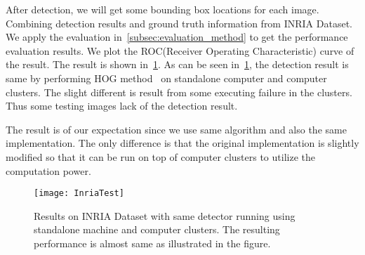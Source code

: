 After detection, we will get some bounding box locations for each image.
Combining detection results and ground truth information from INRIA Dataset.
We apply the evaluation in~\ref{subsec:evaluation_method} to get the
performance evaluation results. We plot the ROC(Receiver Operating
Characteristic) curve of the result.
The result is shown in~\fig\ref{fig:inria_roc}. As can be seen
in~\fig\ref{fig:inria_roc}, the detection result is same by performing HOG
method~\cite{2005_CVPR_Dalal} on standalone computer and computer clusters. The
slight different is result from some executing failure in the clusters. Thus
some testing images lack of the detection result. 

The result is of our expectation since we use same algorithm and also the same
implementation. The only difference is that the original implementation is
slightly modified so that it can be run on top of computer clusters to utilize
the computation power. 


\begin{figure}[]
  \centering
  \begin{minipage}{1.0\columnwidth}
  \texttt{[image: InriaTest]}
  \end{minipage}
  
  \vspace{-1ex}
  \caption
    {
    \small
	Results on INRIA Dataset with same detector running using standalone machine
	and computer clusters. The resulting performance is almost same as illustrated
	in the figure. }
  \label{fig:inria_roc}
\end{figure}
